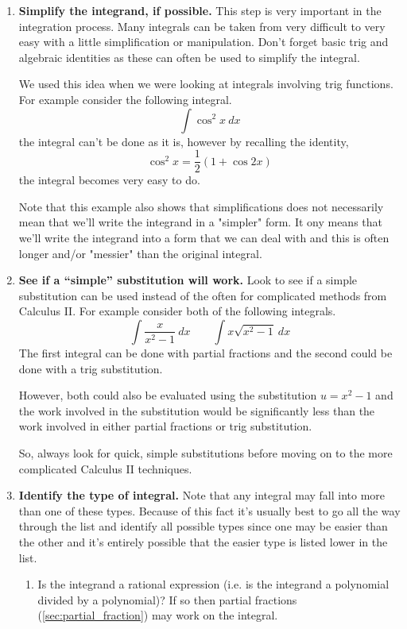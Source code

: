 \begin{enumerate}
\item \textbf{Simplify the integrand, if possible.} This step is very important in the integration process. Many integrals can be taken from very difficult to very easy with a little simplification or manipulation. Don't forget basic trig and algebraic identities as these can often be used to simplify the integral.

We used this idea when we were looking at integrals involving trig functions. For example consider the following integral. $$\int \cos^2 x\ dx$$ the integral can't be done as it is, however by recalling the identity, $$\cos^2 x = \frac{1}{2}(1 + \cos 2x)$$ the integral becomes very easy to do.

Note that this example also shows that simplifications does not necessarily mean that we'll write the integrand in a "simpler" form. It ony means that we'll write the integrand into a form that we can deal with and this is often longer and/or "messier" than the original integral.

\item \textbf{See if a ``simple'' substitution will work.} Look to see if a simple substitution can be used instead of the often for complicated methods from Calculus II. For example consider both of the following integrals.
\[\int \frac{x}{x^2-1}\ dx \qquad \int x\sqrt{x^2 -1}\ dx\]
The first integral can be done with partial fractions and the second could be done with a trig substitution.

However, both could also be evaluated using the substitution $u=x^2 -1$ and the work involved in the substitution would be significantly less than the work involved in either partial fractions or trig substitution.

So, always look for quick, simple substitutions before moving on to the more complicated Calculus II techniques.

\item \textbf{Identify the type of integral.} Note that any integral may fall into more than 
one of these types. Because of this fact it's usually best to go all the way through the list and identify all possible types since one may be easier than the other and it's entirely possible that the easier type is listed lower in the list.

\begin{enumerate}[label= \alph*.]
\item Is the integrand a rational expression (i.e. is the integrand a polynomial divided by a polynomial)? If so then partial fractions (\autoref{sec:partial_fraction}) may work on the integral.


\end{enumerate}
\end{enumerate}
